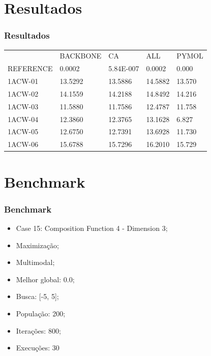 \documentclass{beamer}
\begin{document}
\section{Resultados}

\begin{frame}
\frametitle{Resultados}
\begin{table}[]
\centering
\label{my-label}
\begin{tabular}{lllll}
          & BACKBONE          & CA            & ALL    & PYMOL           \\
REFERENCE & 0.0002 & 5.84E-007     & 0.0002 & 0.000 \\
1ACW-01   & 13.5292     & 13.5886 & 14.5882 & 13.570   \\
1ACW-02   & 14.1559     & 14.2188 & 14.8492 & 14.216    \\
1ACW-03   & 11.5880     & 11.7586 & 12.4787 & 11.758   \\
1ACW-04   & 12.3860     & 12.3765 & 13.1628 & 6.827  \\
1ACW-05   & 12.6750     & 12.7391 & 13.6928 & 11.730   \\
1ACW-06   & 15.6788     & 15.7296 & 16.2010 & 15.729                   
\end{tabular}
\end{table}
\end{frame}

\section{Benchmark}

\begin{frame}
\frametitle{Benchmark}
\begin{itemize}
\item Case 15: Composition Function 4 - Dimension 3;
\item Maximização;
\item Multimodal;
\item Melhor global: 0.0;
\item Busca: [-5, 5];
\item População: 200;
\item Iterações: 800;
\item Execuções: 30
\end{itemize}
\end{frame}
\end{document}
